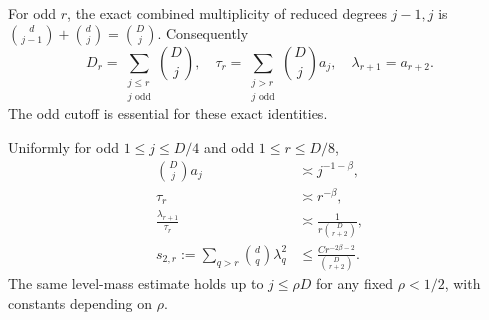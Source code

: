 For odd $r$, the exact combined multiplicity of reduced degrees
$j-1,j$ is $\binom d{j-1}+\binom dj=\binom Dj$. Consequently
\begin{equation}\label{eq:paired}
 D_r=\sum_{\substack{j\le r\\j\text{ odd}}}\binom Dj,
 \quad
 \tau_r=\sum_{\substack{j>r\\j\text{ odd}}}\binom Dj a_j,
 \quad \lambda_{r+1}=a_{r+2}.
\end{equation}
The odd cutoff is essential for these exact identities.

\begin{lemma}\label{lem:sharp}
Uniformly for odd $1\le j\le D/4$ and odd $1\le r\le D/8$,
\begin{align}
 \binom Dj a_j&\asymp j^{-1-\beta},\label{eq:level}\\
 \tau_r&\asymp r^{-\beta},\label{eq:trace}\\
 \frac{\lambda_{r+1}}{\tau_r}
 &\asymp\frac1{r\binom D{r+2}},\label{eq:ratio}\\
 s_{2,r}:=\sum_{q>r}\binom dq\lambda_q^2
 &\le\frac{C r^{-2\beta-2}}{\binom D{r+2}}.
 \label{eq:secondmoment}
\end{align}
The same level-mass estimate holds up to $j\le\rho D$ for any fixed
$\rho<1/2$, with constants depending on $\rho$.
\end{lemma}
